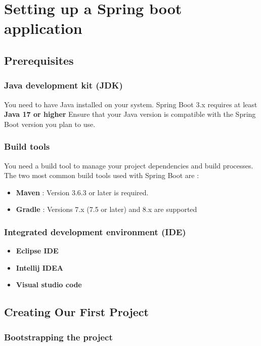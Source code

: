 \documentclass{article}
\begin{document}
\section{Setting up a Spring boot application} 

\subsection{Prerequisites} 

\subsubsection{Java development kit (JDK) }
You need to have Java installed on your system. Spring Boot 3.x requires at least \textbf{Java 17 or higher} Ensure that your Java version is compatible with the Spring Boot version you plan to use.

\subsubsection{Build tools} 
You need a build tool to manage your project dependencies and build processes. The two most common build tools used with Spring Boot are : 
\begin{itemize}
    \item \textbf{Maven} : Version 3.6.3 or later is required.
    \item \textbf{Gradle} : Versions 7.x (7.5 or later) and 8.x are supported
\end{itemize}


\subsubsection{Integrated development environment (IDE)} 
\begin{itemize}
    \item \textbf{Eclipse IDE}
    \item \textbf{Intellij IDEA}
    \item \textbf{Visual studio code}
\end{itemize}


\subsection{Creating Our First Project}
\subsubsection{Bootstrapping the project}
\end{document}

